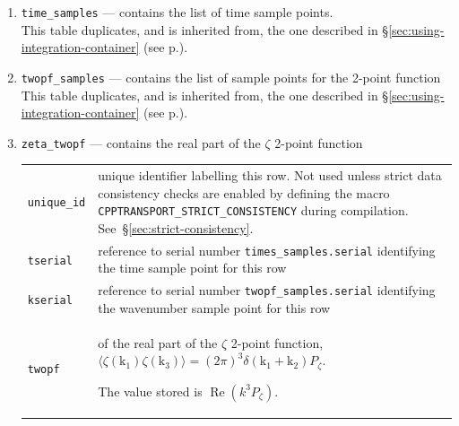 \documentclass[11pt,a4paper]{article}
\newcommand{\Pzeta}{P_\zeta}
\newcommand{\vect}[1]{\bm{\mathrm{{#1}}}}
\newcommand{\semibold}[1]{{\fontseries{b}\selectfont{#1}}}
\newenvironment{sqltablelist}{\renewcommand{\arraystretch}{1.3}\small}{}
\DeclareMathOperator{\realpart}{Re}
\renewcommand{\Re}{\realpart}
\begin{document}
\begin{sqltablelist}
\begin{enumerate}
	\item \texttt{time_samples} --- contains the list of time sample points. \\
	This table duplicates, and is inherited from, the one described in \S\ref{sec:using-integration-container}
	(see p.\pageref{sqltable:time-samples}).
	
	\item \texttt{twopf_samples} --- contains the list of sample points for the 2-point function \\
	This table duplicates, and is inherited from, the one described in \S\ref{sec:using-integration-container}
	(see p.\pageref{sqltable:twopf-samples}).
	
	\item \texttt{zeta_twopf} --- contains the real part of the $\zeta$ 2-point function \\
    \begin{tabular}{p{2.5cm}p{11.2cm}}
        \texttt{unique_id} & unique identifier labelling this row. Not used
        unless strict data consistency checks are enabled
        by defining the macro
        \texttt{CPPTRANSPORT_STRICT_CONSISTENCY} during
        compilation. See~\S\ref{sec:strict-consistency}. \\
        \texttt{tserial} & reference to serial number \texttt{times_samples.serial}
        identifying the time sample point for this row \\
        \texttt{kserial} & reference to serial number \texttt{twopf_samples.serial}
        identifying the wavenumber sample point for this row \\
        \texttt{twopf} & \semibold{dimensionless value} of
        the real part of the $\zeta$ 2-point function,
        $\langle \zeta(\vect{k}_1) \zeta(\vect{k}_3) \rangle = (2\pi)^3 \delta(\vect{k}_1 + \vect{k}_2)
        \Pzeta$.

        The value stored is $\Re(k^3 \Pzeta)$.
    \end{tabular}
    

\end{enumerate}
\end{sqltablelist}
\end{document}
